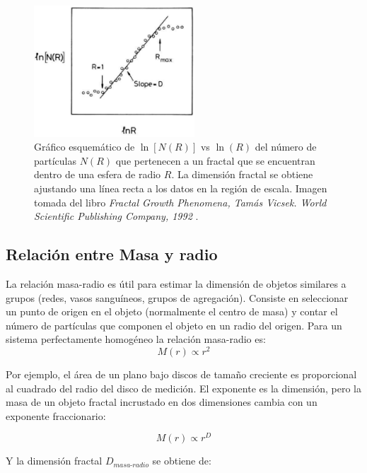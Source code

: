 \documentclass[11pt]{article}
\begin{document}
\begin{figure}[h!]
\vspace{1cm}
\centering
{\includegraphics[width=6cm]{Vicsek-Fractal} \par}
\caption{ Gráfico esquem\'{a}tico de $\ln[N(R)]$ vs $\ln (R)$  del número de partículas $N(R)$ que pertenecen a un fractal que se encuentran dentro de una esfera de radio $R$. La dimensión fractal se obtiene ajustando una línea recta a los datos en la región de escala. Imagen tomada del libro \textit{Fractal Growth Phenomena, Tam\'{a}s Vicsek. World Scientific Publishing Company, 1992} \cite{Vicsek1992}.}
\label{fig:Vicsek-Fractal}
\end{figure}
 

\subsection{Relaci\'{o}n entre Masa y radio}
\label{subsec:subseccion2.4}

La relaci\'{o}n masa-radio es \'{u}til para estimar la dimensi\'{o}n de objetos similares a grupos (redes, vasos sangu\'{i}neos, grupos de agregaci\'{o}n). Consiste en seleccionar un punto de origen en el objeto (normalmente el centro de masa) y contar el n\'{u}mero de part\'{i}culas que componen el objeto en un radio del origen. Para un sistema perfectamente homog\'{e}neo la relaci\'{o}n masa-radio es:
\begin{equation}
M(r) \propto r^{2}
\end{equation}

Por ejemplo, el \'{a}rea de un plano bajo discos de tamaño creciente es proporcional al cuadrado del radio del disco de medici\'{o}n. El exponente es la dimensi\'{o}n, pero la masa de un objeto fractal incrustado en dos dimensiones cambia con un exponente fraccionario:

\begin{equation}
M(r) \propto r^{D} 
\end{equation}

Y la dimensi\'{o}n fractal $D_\textit{{masa-radio}}$ se obtiene de:
\end{document}
